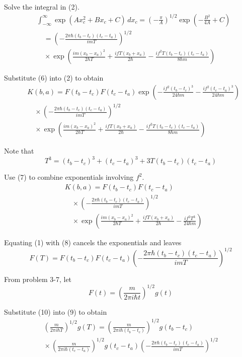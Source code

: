 \documentclass[12pt]{article}
\begin{document}
\bigskip
Solve the integral in (2).
\begin{align*}
&\int_{-\infty}^{\infty}\exp(Ax_c^2+Bx_c+C)\,dx_c
=\left(-\frac{\pi}{A}\right)^{1/2}
\exp\left(-\frac{B^2}{4A}+C\right)
\\
&\quad{}=\left(-\frac{2\pi\hbar(t_b-t_c)(t_c-t_a)}{imT}\right)^{1/2}
\\
&\quad{}\times\exp\left(
\frac{im(x_b-x_a)^2}{2\hbar T}
+\frac{ifT(x_b+x_a)}{2\hbar}
-\frac{if^2T(t_b-t_c)(t_c-t_a)}{8\hbar m}
\right)
\tag{6}
\end{align*}

Substitute (6) into (2) to obtain
\begin{align*}
&K(b,a)=F(t_b-t_c)F(t_c-t_a)
\exp\left(-\frac{if^2(t_b-t_c)^3}{24\hbar m}-\frac{if^2(t_c-t_a)^3}{24\hbar m}\right)
\\
&\quad{}\times
\left(-\frac{2\pi\hbar(t_b-t_c)(t_c-t_a)}{imT}\right)^{1/2}
\\
&\quad{}\times
\exp\left(
\frac{im(x_b-x_a)^2}{2\hbar T}
+\frac{ifT(x_b+x_a)}{2\hbar}
-\frac{if^2T(t_b-t_c)(t_c-t_a)}{8\hbar m}
\right)
\end{align*}

Note that
\begin{equation*}
T^3=(t_b-t_c)^3+(t_c-t_a)^3+3T(t_b-t_c)(t_c-t_a)
\tag{7}
\end{equation*}

Use (7) to combine exponentials involving $f^2$.
\begin{align*}
&K(b,a)=F(t_b-t_c)F(t_c-t_a)
\\
&\quad{}\times
\left(-\frac{2\pi\hbar(t_b-t_c)(t_c-t_a)}{imT}\right)^{1/2}
\\
&\quad{}\times
\exp\left(
\frac{im(x_b-x_a)^2}{2\hbar T}
+\frac{ifT(x_b+x_a)}{2\hbar}
-\frac{if^2T^3}{24\hbar m}
\right)
\tag{8}
\end{align*}

Equating (1) with (8) cancels the exponentials and leaves
\begin{equation*}
F(T)=F(t_b-t_c)F(t_c-t_a)
\left(-\frac{2\pi\hbar(t_b-t_c)(t_c-t_a)}{imT}\right)^{1/2}
\tag{9}
\end{equation*}

From problem 3-7, let
\begin{equation*}
F(t)=\left(\frac{m}{2\pi i\hbar t}\right)^{1/2} g(t)
\tag{10}
\end{equation*}

Substitute (10) into (9) to obtain
\begin{multline*}
\left(\frac{m}{2\pi i\hbar T}\right)^{1/2} g(T)
=\left(\frac{m}{2\pi i\hbar(t_b-t_c)}\right)^{1/2} g(t_b-t_c)
\\
{}\times
\left(\frac{m}{2\pi i\hbar(t_c-t_a)}\right)^{1/2} g(t_c-t_a)
\left(-\frac{2\pi\hbar(t_b-t_c)(t_c-t_a)}{imT}\right)^{1/2}
\end{multline*}
\end{document}
